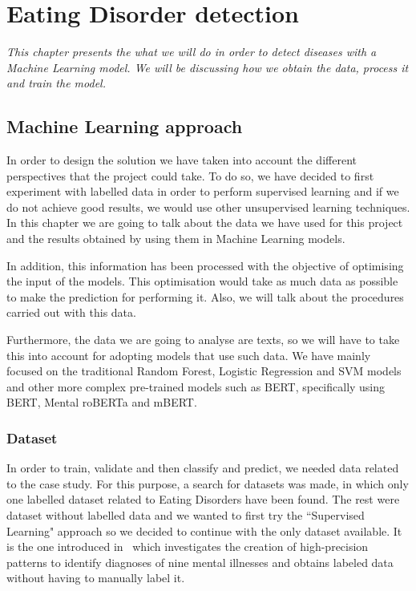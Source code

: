 \chapter{Eating Disorder detection}
\label{chap:architecture}
\textit{This chapter presents the what we will do in order to detect diseases with a Machine Learning model. We will be discussing how we obtain the data, process it and train the model.}

\clearpage
\section{Machine Learning approach}
In order to design the solution we have taken into account the different perspectives that the project could take. To do so, we have decided to first experiment with labelled data in order to perform supervised learning and if we do not achieve good results, we would use other unsupervised learning techniques. In this chapter we are going to talk about the data we have used for this project and the results obtained by using them in Machine Learning models.

In addition, this information has been processed with the objective of optimising the input of the models. This optimisation would take as much data as possible to make the prediction for performing it. Also, we will talk about the procedures carried out with this data.

Furthermore, the data we are going to analyse are texts, so we will have to take this into account for adopting models that use such data. We have mainly focused on the traditional Random Forest, Logistic Regression and SVM models and other more complex pre-trained models such as BERT, specifically using BERT, Mental roBERTa and mBERT.


\subsection{Dataset}
\label{sec:dataset}
In order to train, validate and then classify and predict, we needed data related to the case study. For this purpose, a search for datasets was made, in which only one labelled dataset related to Eating Disorders have been found. The rest were dataset without labelled data and we wanted to first try the ``Supervised Learning" approach so we decided to continue with the only dataset available. It is the one introduced in~\cite{https://doi.org/10.48550/arxiv.1806.05258} which investigates the creation of high-precision patterns to identify diagnoses of nine mental illnesses and obtains labeled data without having to manually label it.

